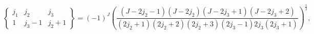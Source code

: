 \[\begin{Bmatrix}j_{1}&j_{2}&j_{3}\\
1&j_{3}-1&j_{2}+1\end{Bmatrix}=(-1)^{J}\left(\frac{(J-2j_{2}-1)(J-2j_{2})(J-2j%
_{3}+1)(J-2j_{3}+2)}{(2j_{2}+1)(2j_{2}+2)(2j_{2}+3)(2j_{3}-1)2j_{3}(2j_{3}+1)}%
\right)^{\frac{1}{2}},\]